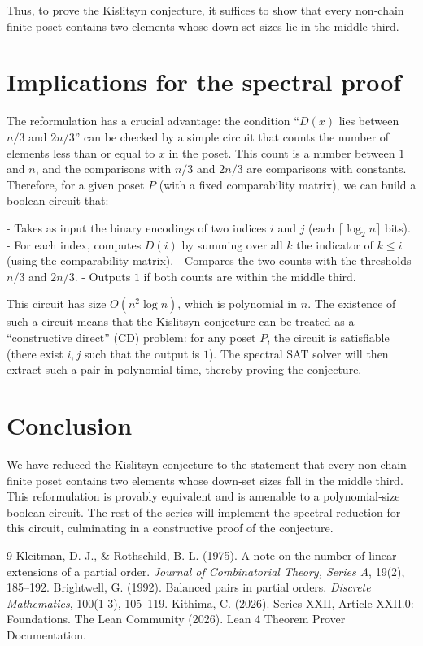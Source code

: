 \documentclass[11pt,a4paper]{article}
\begin{document}
Thus, to prove the Kislitsyn conjecture, it suffices to show that every non‑chain finite poset contains two elements whose down‑set sizes lie in the middle third.

\section{Implications for the spectral proof}

The reformulation has a crucial advantage: the condition “$D(x)$ lies between $n/3$ and $2n/3$” can be checked by a simple circuit that counts the number of elements less than or equal to $x$ in the poset. This count is a number between $1$ and $n$, and the comparisons with $n/3$ and $2n/3$ are comparisons with constants. Therefore, for a given poset $P$ (with a fixed comparability matrix), we can build a boolean circuit that:

- Takes as input the binary encodings of two indices $i$ and $j$ (each $\lceil \log_2 n\rceil$ bits).
- For each index, computes $D(i)$ by summing over all $k$ the indicator of $k \le i$ (using the comparability matrix).
- Compares the two counts with the thresholds $n/3$ and $2n/3$.
- Outputs $1$ if both counts are within the middle third.

This circuit has size $O(n^2 \log n)$, which is polynomial in $n$. The existence of such a circuit means that the Kislitsyn conjecture can be treated as a “constructive direct” (CD) problem: for any poset $P$, the circuit is satisfiable (there exist $i,j$ such that the output is $1$). The spectral SAT solver will then extract such a pair in polynomial time, thereby proving the conjecture.

\section{Conclusion}

We have reduced the Kislitsyn conjecture to the statement that every non‑chain finite poset contains two elements whose down‑set sizes fall in the middle third. This reformulation is provably equivalent and is amenable to a polynomial‑size boolean circuit. The rest of the series will implement the spectral reduction for this circuit, culminating in a constructive proof of the conjecture.


\begin{thebibliography}{9}
  Kleitman, D. J., \& Rothschild, B. L. (1975). A note on the number of linear extensions of a partial order. \emph{Journal of Combinatorial Theory, Series A}, 19(2), 185–192.
  Brightwell, G. (1992). Balanced pairs in partial orders. \emph{Discrete Mathematics}, 100(1-3), 105–119.
  Kithima, C. (2026). Series XXII, Article XXII.0: Foundations.
  The Lean Community (2026). Lean 4 Theorem Prover Documentation.
\end{thebibliography}
\end{document}
